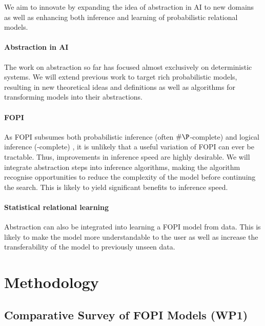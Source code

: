 \documentclass[11pt,english,twocolumn]{article}
\begin{document}
We aim to innovate by expanding the idea of abstraction in AI to new domains as
well as enhancing both inference and learning of probabilistic relational
models.

\paragraph{Abstraction in AI} The work on abstraction so far has focused almost
exclusively on deterministic systems. We will extend previous work to target
rich probabilistic models, resulting in new theoretical ideas and definitions as
well as algorithms for transforming models into their abstractions.

\paragraph{FOPI} As FOPI subsumes both probabilistic inference (often
$\#\P$-complete) and logical inference (\NP-complete)
\cite{DBLP:journals/ml/RichardsonD06}, it is unlikely that a useful variation of
FOPI can ever be tractable. Thus, improvements in inference speed are highly
desirable. We will integrate abstraction steps into inference algorithms,
making the algorithm recognise opportunities to reduce the complexity of the
model before continuing the search. This is likely to yield significant benefits
to inference speed.

\paragraph{Statistical relational learning} Abstraction can also be integrated
into learning a FOPI model from data. This is likely to make the model more
understandable to the user as well as increase the transferability of the model
to previously unseen data.

\section{Methodology} %

\subsection*{Comparative Survey of FOPI Models (WP1)}
\end{document}
